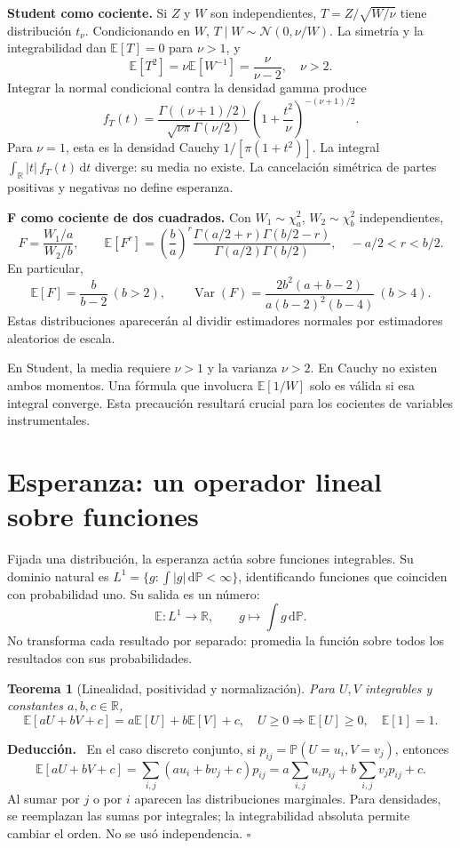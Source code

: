 \documentclass[11pt,a4paper]{article}
\newcommand{\R}{\mathbb R}
\newcommand{\E}{\mathbb E}
\newcommand{\Prob}{\mathbb P}
\newcommand{\dd}{\,\mathrm d}
\newcommand{\abs}[1]{\left\lvert #1\right\rvert}
\DeclareMathOperator{\Var}{Var}
\newcommand{\Normal}{\mathcal N}
\newcommand{\topic}[2]{\clearpage\section{#1}\label{#2}}
\newenvironment{deduccion}{\par\textbf{Deducción.}\ }{\hfill$\square$\par}
\newtheorem{teorema}{Teorema}[section]
\theoremstyle{definition}\newtheorem{definicion}[teorema]{Definición}
\begin{document}
\textbf{Student como cociente.} Si $Z$ y $W$ son independientes,
$T=Z/\sqrt{W/\nu}$ tiene distribución $t_\nu$.
Condicionando en $W$, $T\mid W\sim\Normal(0,\nu/W)$.
La simetría y la integrabilidad dan $\E[T]=0$ para $\nu>1$, y
\[
\E[T^2]=\nu\E[W^{-1}]=\frac{\nu}{\nu-2},\quad \nu>2.
\]
Integrar la normal condicional contra la densidad gamma produce
\[
f_T(t)=\frac{\Gamma((\nu+1)/2)}
{\sqrt{\nu\pi}\Gamma(\nu/2)}
\left(1+\frac{t^2}{\nu}\right)^{-(\nu+1)/2}.
\]
Para $\nu=1$, esta es la densidad Cauchy $1/[\pi(1+t^2)]$.
La integral $\int_\R\abs t\,f_T(t)\dd t$ diverge: su media no existe.
La cancelación simétrica de partes positivas y negativas no define esperanza.

\textbf{F como cociente de dos cuadrados.} Con $W_1\sim\chi^2_a$,
$W_2\sim\chi^2_b$ independientes,
\[
F=\frac{W_1/a}{W_2/b},\qquad
\E[F^r]=\left(\frac ba\right)^r
\frac{\Gamma(a/2+r)\Gamma(b/2-r)}
{\Gamma(a/2)\Gamma(b/2)},\quad -a/2<r<b/2.
\]
En particular,
\[
\E[F]=\frac b{b-2}\ (b>2),\qquad
\Var(F)=\frac{2b^2(a+b-2)}{a(b-2)^2(b-4)}\ (b>4).
\]
Estas distribuciones aparecerán al dividir estimadores normales por
estimadores aleatorios de escala.

\begin{cuidado}
En Student, la media requiere $\nu>1$ y la varianza $\nu>2$.
En Cauchy no existen ambos momentos. Una fórmula que involucra
$\E[1/W]$ solo es válida si esa integral converge. Esta precaución
resultará crucial para los cocientes de variables instrumentales.
\end{cuidado}

\topic{Esperanza: un operador lineal sobre funciones}{s07}
Fijada una distribución, la esperanza actúa sobre funciones integrables.
Su dominio natural es
$L^1=\{g:\int\abs g\dd\Prob<\infty\}$, identificando funciones que coinciden
con probabilidad uno. Su salida es un número:
\[
\E:L^1\longrightarrow\R,\qquad g\longmapsto\int g\dd\Prob.
\]
No transforma cada resultado por separado: promedia la función sobre todos
los resultados con sus probabilidades.

\begin{teorema}[Linealidad, positividad y normalización]
Para $U,V$ integrables y constantes $a,b,c\in\R$,
\[
\E[aU+bV+c]=a\E[U]+b\E[V]+c,\quad
U\ge0\Rightarrow\E[U]\ge0,\quad \E[1]=1.
\]
\end{teorema}
\begin{deduccion}
En el caso discreto conjunto, si
$p_{ij}=\Prob(U=u_i,V=v_j)$, entonces
\[
\E[aU+bV+c]=\sum_{i,j}(au_i+bv_j+c)p_{ij}
=a\sum_{i,j}u_ip_{ij}+b\sum_{i,j}v_jp_{ij}+c.
\]
Al sumar por $j$ o por $i$ aparecen las distribuciones marginales.
Para densidades, se reemplazan las sumas por integrales; la integrabilidad
absoluta permite cambiar el orden. No se usó independencia.
\end{deduccion}
\end{document}
